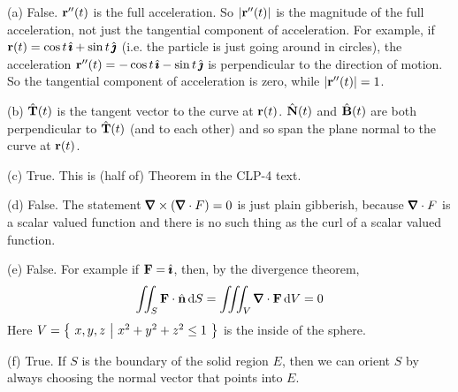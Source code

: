 \begin{solution} (a)
False. $\mathbf{r}''(t)$ is the full acceleration. So $|\mathbf{r}''(t)|$
is the magnitude of the full acceleration, not just the tangential
component of acceleration. For example, if $\mathbf{r}(t) =\cos t\,\hat{\pmb{\imath}}+\sin t\,\hat{\pmb{\jmath}}$
(i.e. the particle is just going around in circles), the
acceleration $\mathbf{r}''(t) = -\cos t\,\hat{\pmb{\imath}}-\sin t\,\hat{\pmb{\jmath}}$ is perpendicular
to the direction of motion. So the tangential component of acceleration
is zero, while $|\mathbf{r}''(t)|=1$.

\noindent (b) $\hat{\mathbf{T}}(t)$ is the tangent vector to the curve at $\mathbf{r}(t)$.
$\hat{\mathbf{N}}(t)$ and $\hat{\mathbf{B}}(t)$ are both perpendicular to $\hat{\mathbf{T}}(t)$
(and to each other) and so span the plane normal to the curve at $\mathbf{r}(t)$.

\noindent (c) True.
This is (half of) Theorem   in
the CLP-4 text.

\noindent (d) False. The statement $\vnabla\times(\vnabla\cdot F) = 0$
is just plain gibberish, because $\vnabla\cdot F$ is a scalar valued function
and there is no such thing as the curl of a scalar valued function.

\noindent (e) False. For example if $\mathbf{F}=\hat{\pmb{\imath}}$, then, by the divergence theorem,
\begin{equation*}
\dblInt_S \vF \cdot\hn\,\dee{S} 
 =\tripInt_V\vnabla\cdot\vF\,\dee{V}=0
\end{equation*}
Here $V=\big\{ \ x,y,z\ \big|\ x^2+y^2+z^2\le 1\ \big\}$ is the inside of the sphere.

\noindent (f) True. If $S$ is the boundary of the solid region $E$, then
we can orient $S$ by always choosing the normal vector that points into $E$. 

\end{solution}

